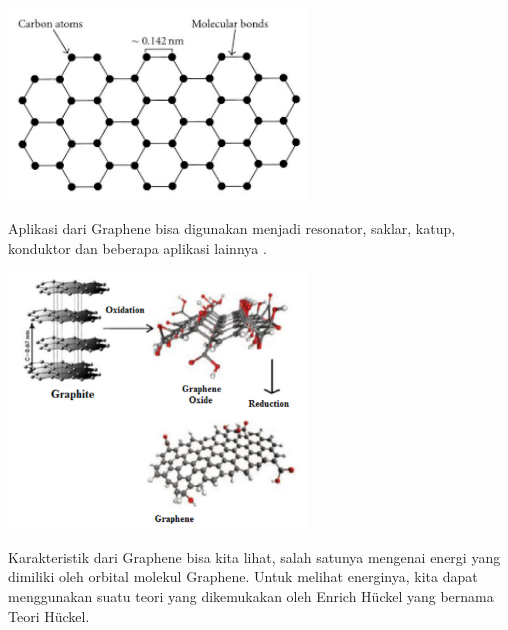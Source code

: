 \documentclass[12pt,a4paper]{report}
\begin{document}
	\begin{center}
	\includegraphics[width=8cm]{gambar/grafen.png}
	\end{center}
	
	Aplikasi dari Graphene bisa digunakan menjadi resonator, saklar, katup, konduktor dan beberapa aplikasi lainnya \cite{Clemons2010}.
	
	\begin{center}
		\includegraphics[width=8cm]{gambar/oksgraf.png}
	\end{center}
	
	Karakteristik dari Graphene bisa kita lihat, salah satunya mengenai energi yang dimiliki oleh orbital molekul Graphene. Untuk melihat energinya, kita dapat menggunakan suatu teori yang dikemukakan oleh Enrich Hückel yang bernama Teori Hückel. 
	
\end{document}
